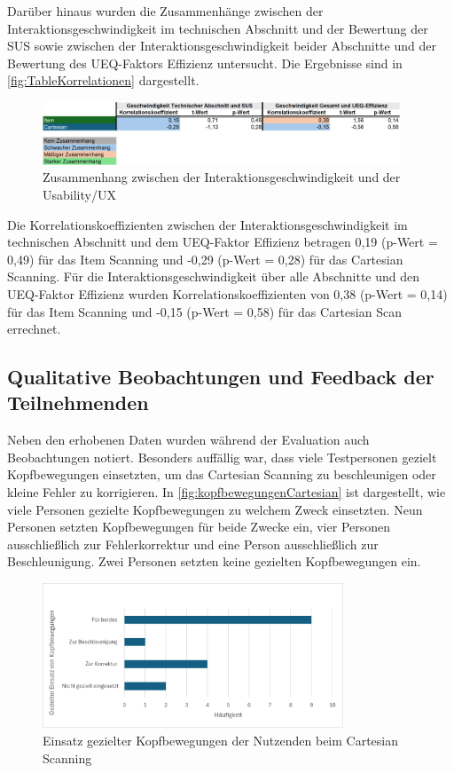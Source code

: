 Darüber hinaus wurden die Zusammenhänge zwischen der Interaktionsgeschwindigkeit im technischen Abschnitt und der Bewertung der SUS sowie zwischen der Interaktionsgeschwindigkeit beider Abschnitte und der Bewertung des UEQ-Faktors Effizienz untersucht. Die Ergebnisse sind in \autoref{fig:TableKorrelationen} dargestellt. 

\begin{figure}[tbh]
    \centering
    \includegraphics[width=0.95\textwidth]{images/Results/Korrelationen-Rest.png}
    \caption{Zusammenhang zwischen der Interaktionsgeschwindigkeit und der Usability/UX}
    \label{fig:TableKorrelationen}
\end{figure}

Die Korrelationskoeffizienten zwischen der Interaktionsgeschwindigkeit im technischen Abschnitt und dem UEQ-Faktor Effizienz betragen 0,19 (p-Wert = 0,49) für das Item Scanning und -0,29 (p-Wert = 0,28) für das Cartesian Scanning. Für die Interaktionsgeschwindigkeit über alle Abschnitte und den UEQ-Faktor Effizienz wurden Korrelationskoeffizienten von 0,38 (p-Wert = 0,14) für das Item Scanning und -0,15 (p-Wert = 0,58) für das Cartesian Scan errechnet.

\subsection{Qualitative Beobachtungen und Feedback der Teilnehmenden}

Neben den erhobenen Daten wurden während der Evaluation auch Beobachtungen notiert. Besonders auffällig war, dass viele Testpersonen gezielt Kopfbewegungen einsetzten, um das Cartesian Scanning zu beschleunigen oder kleine Fehler zu korrigieren. In \autoref{fig:kopfbewegungenCartesian} ist dargestellt, wie viele Personen gezielte Kopfbewegungen zu welchem Zweck einsetzten. Neun Personen setzten Kopfbewegungen für beide Zwecke ein, vier Personen ausschließlich zur Fehlerkorrektur und eine Person ausschließlich zur Beschleunigung. Zwei Personen setzten keine gezielten Kopfbewegungen ein.

\begin{figure}[tbh]
    \centering
    \includegraphics[width=0.8\textwidth]{images/Results/EinsatzKopfbewegungen-Cartesian.png}
    \caption{Einsatz gezielter Kopfbewegungen der Nutzenden beim Cartesian Scanning}
    \label{fig:kopfbewegungenCartesian}
\end{figure}

